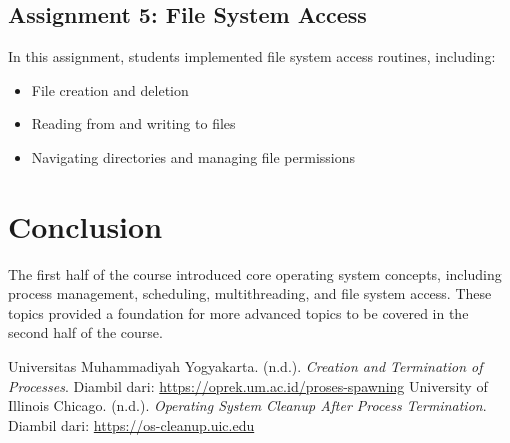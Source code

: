 \documentclass[12pt]{article}
\begin{document}
\subsection{Assignment 5: File System Access}
In this assignment, students implemented file system access routines, including:
\begin{itemize}
    \item File creation and deletion
    \item Reading from and writing to files
    \item Navigating directories and managing file permissions
\end{itemize}

\section{Conclusion}
The first half of the course introduced core operating system concepts, including process management, scheduling, multithreading, and file system access. These topics provided a foundation for more advanced topics to be covered in the second half of the course.

\begin{thebibliography}{}
 Universitas Muhammadiyah Yogyakarta. (n.d.). \textit{Creation and Termination of Processes}. Diambil dari: \url{https://oprek.um.ac.id/proses-spawning}
 University of Illinois Chicago. (n.d.). \textit{Operating System Cleanup After Process Termination}. Diambil dari: \url{https://os-cleanup.uic.edu}
\end{thebibliography}
\end{document}
